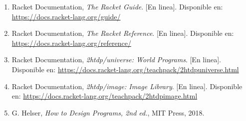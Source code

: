 \documentclass[12pt,a4paper]{article}
\begin{document}
\begin{enumerate}
    \item Racket Documentation, \textit{The Racket Guide}. [En linea]. Disponible en: \url{https://docs.racket-lang.org/guide/}
    \item Racket Documentation, \textit{The Racket Reference}. [En linea]. Disponible en: \url{https://docs.racket-lang.org/reference/}
    \item Racket Documentation, \textit{2htdp/universe: World Programs}. [En linea]. Disponible en: \url{https://docs.racket-lang.org/teachpack/2htdpuniverse.html}
    \item Racket Documentation, \textit{2htdp/image: Image Library}. [En linea]. Disponible en: \url{https://docs.racket-lang.org/teachpack/2htdpimage.html}
    \item G. Helser, \textit{How to Design Programs, 2nd ed.}, MIT Press, 2018.
\end{enumerate}
\end{document}
